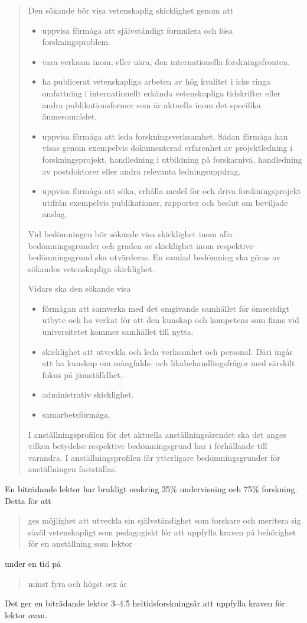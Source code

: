 \documentclass[a4paper,oneside,article,swedish]{memoir}
\begin{document}
\blockcquote[ss.~11--12]{Anställningsordning}{%
  Den sökande bör visa vetenskaplig skicklighet genom att
  \begin{itemize}
    \item uppvisa förmåga att självständigt formulera och lösa forskningsproblem.
    \item vara verksam inom, eller nära, den internationella forskningsfronten.
    \item ha publicerat vetenskapliga arbeten av hög kvalitet i icke ringa 
      omfattning i internationellt erkända vetenskapliga tidskrifter eller andra 
      publikationsformer som är aktuella inom det specifika ämnesområdet.
    \item uppvisa förmåga att leda forskningsverksamhet. Sådan förmåga kan visas 
      genom exempelvis dokumenterad erfarenhet av projektledning i 
      forskningsprojekt, handledning i utbildning på forskarnivå, handledning av 
      postdoktorer eller andra relevanta ledningsuppdrag.
    \item uppvisa förmåga att söka, erhålla medel för och driva forskningsprojekt 
      utifrån exempelvis publikationer, rapporter och beslut om beviljade anslag.
  \end{itemize}
  Vid bedömningen bör sökande visa skicklighet inom alla bedömningsgrunder och 
  graden av skicklighet inom respektive bedömningsgrund ska utvärderas. En samlad 
  bedömning ska göras av sökandes vetenskapliga skicklighet.

  Vidare ska den sökande visa
  \begin{itemize}
    \item förmågan att samverka med det omgivande samhället för ömsesidigt utbyte och ha verkat för att den kunskap och kompetens som finns vid universitetet 
      kommer samhället till nytta.
    \item skicklighet att utveckla och leda verksamhet och personal. Däri ingår 
      att ha kunskap om mångfalds- och likabehandlingsfrågor med särskilt fokus 
      på jämställdhet.
    \item administrativ skicklighet.
    \item samarbetsförmåga.
  \end{itemize}
  I anställningsprofilen för det aktuella anställningsärendet ska det anges 
  vilken betydelse respektive bedömningsgrund har i förhållande till varandra. I 
  anställningsprofilen får ytterligare bedömningsgrunder för anställningen 
  fastställas.%
}

En biträdande lektor har brukligt omkring 25\% undervisning och 75\% forskning.
Detta för att
\blockcquote[kap.~4, 12 a §]{Högskoleförordningen}{%
  ges möjlighet att utveckla sin självständighet som forskare och meritera sig 
  såväl vetenskapligt som pedagogiskt för att uppfylla kraven på behörighet för 
  en anställning som lektor%
} under en tid på
\blockcquote[kap.~4, 12 a §]{Högskoleförordningen}{%
  minst fyra och högst sex år%
}.
Det ger en biträdande lektor 3--4.5 heltidsforskningsår att uppfylla kraven för 
lektor ovan.
\end{document}
